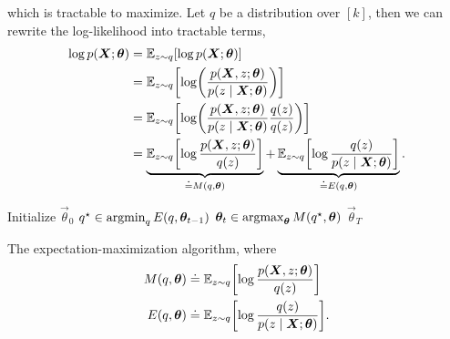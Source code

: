 which is tractable to maximize. Let $q$ be a distribution over $[k]$, then we can rewrite the
log-likelihood into tractable terms,
\begin{align*}
    \log p(\mat{X}; \vec{\theta}) & = \E_{z \sim q} [\log p(\mat{X}; \vec{\theta})]                                                                                                                                                                                            \\
                                  & = \E_{z \sim q} \lft[ \log \lft( \frac{p(\mat{X}, z; \vec{\theta})}{p(z \mid \mat{X}; \vec{\theta})} \rgt) \rgt]                                                                                                                           \\
                                  & = \E_{z \sim q} \lft[ \log \lft( \frac{p(\mat{X}, z; \vec{\theta})}{p(z \mid \mat{X}; \vec{\theta})} \frac{q(z)}{q(z)} \rgt) \rgt]                                                                                                         \\
                                  & = \underbrace{\E_{z \sim q} \lft[ \log \frac{p(\mat{X}, z; \vec{\theta})}{q(z)} \rgt]}_{\doteq M(q, \vec{\theta})} + \underbrace{\E_{z \sim q} \lft[ \log \frac{q(z)}{p(z \mid \mat{X}; \vec{\theta})} \rgt]}_{\doteq E(q, \vec{\theta})}.
\end{align*}

\begin{algorithm}[t]
    \begin{algorithmic}[1]
        \State Initialize $\vec{\theta}_0$
        \State $q^\star \in \operatorname*{argmin}_{q} E(q, \bm{\theta}_{t-1})$
        \State $\bm{\theta}_t \in \operatorname*{argmax}_{\bm{\theta}} M(q^\star, \bm{\theta})$
        \EndFor
        \State \Return $\vec{\theta}_T$
    \end{algorithmic}
    \caption{The expectation-maximization algorithm, where
        \begin{align*}
            M(q, \vec{\theta}) & \doteq \E_{z \sim q} \lft[ \log \frac{p(\mat{X}, z; \vec{\theta})}{q(z)} \rgt]      \\
            E(q, \vec{\theta}) & \doteq \E_{z \sim q} \lft[ \log \frac{q(z)}{p(z \mid \mat{X}; \vec{\theta})} \rgt].
        \end{align*}}
\end{algorithm}

